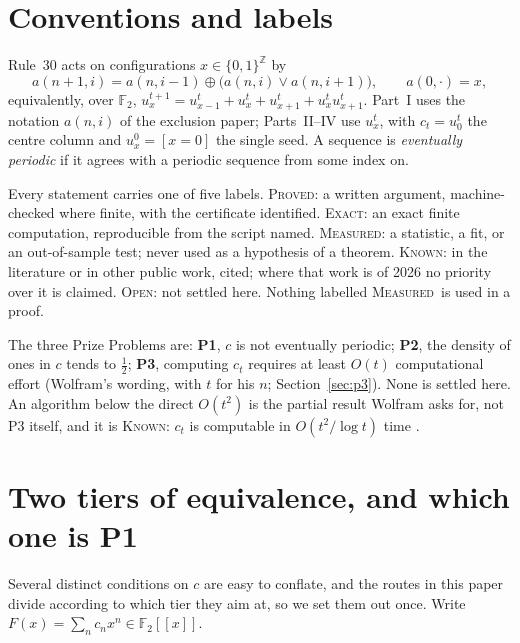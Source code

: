 \documentclass[11pt]{article}
\theoremstyle{definition}
\theoremstyle{remark}
\newcommand{\Z}{\mathbb{Z}}
\newcommand{\F}{\mathbb{F}_2}
\newcommand{\PROVED}{\textsc{Proved}}
\newcommand{\EXACT}{\textsc{Exact}}
\newcommand{\MEASURED}{\textsc{Measured}}
\newcommand{\KNOWN}{\textsc{Known}}
\newcommand{\OPEN}{\textsc{Open}}
\begin{document}
\begin{abstract}
No route to any of the three Prize Problems is claimed. Part~VI states exactly where each route stops, and a separate section states why no measure-level argument can reach Problem~2.
\end{abstract}

\tableofcontents

\section{Conventions and labels}\label{sec:conventions}

Rule~30 acts on configurations $x\in\{0,1\}^{\Z}$ by
\begin{equation}\label{eq:rule30}
a(n+1,i)=a(n,i-1)\oplus\bigl(a(n,i)\vee a(n,i+1)\bigr),\qquad a(0,\cdot)=x,
\end{equation}
equivalently, over $\F$, $u^{t+1}_x=u^t_{x-1}+u^t_x+u^t_{x+1}+u^t_xu^t_{x+1}$. Part~I uses the notation $a(n,i)$ of the exclusion paper; Parts~II--IV use $u^t_x$, with $c_t=u^t_0$ the centre column and $u^0_x=[x=0]$ the single seed. A sequence is \emph{eventually periodic} if it agrees with a periodic sequence from some index on.

Every statement carries one of five labels. \PROVED: a written argument, machine-checked where finite, with the certificate identified. \EXACT: an exact finite computation, reproducible from the script named. \MEASURED: a statistic, a fit, or an out-of-sample test; never used as a hypothesis of a theorem. \KNOWN: in the literature or in other public work, cited; where that work is of 2026 no priority over it is claimed. \OPEN: not settled here. Nothing labelled \MEASURED\ is used in a proof.

The three Prize Problems are: \textbf{P1}, $c$ is not eventually periodic; \textbf{P2}, the density of ones in $c$ tends to $\tfrac12$; \textbf{P3}, computing $c_t$ requires at least $O(t)$ computational effort (Wolfram's wording, with $t$ for his $n$; Section~\ref{sec:p3}). None is settled here. An algorithm below the direct $O(t^{2})$ is the partial result Wolfram asks for, not P3 itself, and it is \KNOWN: $c_t$ is computable in $O(t^{2}/\log t)$ time \cite{NA}.

\section{Two tiers of equivalence, and which one is P1}\label{sec:tiers}

Several distinct conditions on $c$ are easy to conflate, and the routes in this paper divide according
to which tier they aim at, so we set them out once. Write $F(x)=\sum_n c_nx^n\in\F[[x]]$.
\end{document}
